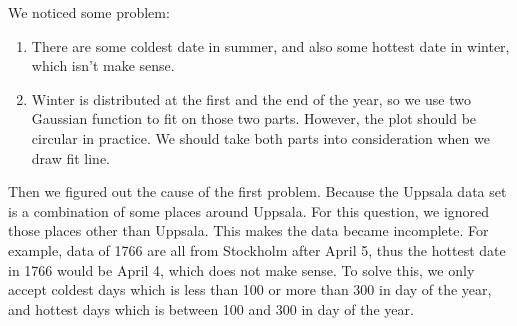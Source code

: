 \documentclass[a4paper]{article}
\begin{document}
We noticed some problem:
\begin{enumerate}
\item There are some coldest date in summer, and also some hottest date in winter, which isn't make sense.
\item Winter is distributed at the first and the end of the year, so we use two Gaussian function to fit on those two parts. However, the plot should be circular in practice. We should take both parts into consideration when we draw fit line.
\end{enumerate}
Then we figured out the cause of the first problem. Because the Uppsala data set is a combination of some places around Uppsala. For this question, we ignored those places other than Uppsala. This makes the data became incomplete. For example, data of 1766 are all from Stockholm after April 5, thus the hottest date in 1766 would be April 4, which does not make sense. To solve this, we only accept coldest days which is less than 100 or more than 300 in day of the year, and hottest days which is between 100 and 300 in day of the year.
\end{document}
